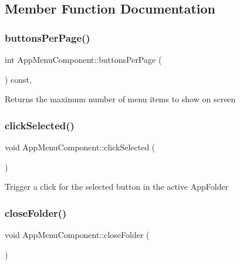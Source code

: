 \subsection{Member Function Documentation}
\mbox{\label{classAppMenuComponent_ac49b72c82ee49d659702df629206c3ed}} 
\subsubsection{\texorpdfstring{buttons\+Per\+Page()}{buttonsPerPage()}}
{\footnotesize\ttfamily int App\+Menu\+Component\+::buttons\+Per\+Page (\begin{DoxyParamCaption}{ }\end{DoxyParamCaption}) const\hspace{0.3cm}{\ttfamily [inline]}, {\ttfamily [protected]}}

\begin{DoxyReturn}{Returns}
the maximum number of menu items to show on screen 
\end{DoxyReturn}
\mbox{\label{classAppMenuComponent_a489731e0173f2e22392403326957b402}} 
\subsubsection{\texorpdfstring{click\+Selected()}{clickSelected()}}
{\footnotesize\ttfamily void App\+Menu\+Component\+::click\+Selected (\begin{DoxyParamCaption}{ }\end{DoxyParamCaption})\hspace{0.3cm}{\ttfamily [protected]}}

Trigger a click for the selected button in the active App\+Folder \mbox{\label{classAppMenuComponent_ab129bc87304b1dddfe497599bdcb9051}} 
\subsubsection{\texorpdfstring{close\+Folder()}{closeFolder()}}
{\footnotesize\ttfamily void App\+Menu\+Component\+::close\+Folder (\begin{DoxyParamCaption}{ }\end{DoxyParamCaption})\hspace{0.3cm}{\ttfamily [protected]}}

